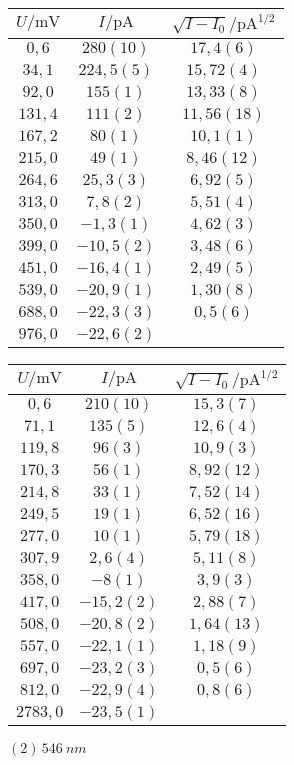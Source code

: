 \begin{figure}[htbp]
   \centering
\parbox{0.475\linewidth}{\centering
\begin{tabular}{c c c}
\hline$U / \unit{\milli\volt}$ & $I / \unit{\pico\ampere}$ & $\sqrt{I-I_0} / \unit{\pico\ampere\tothe{1/2}}$ \\ 
\hline
$0,6$ & $280(10)$ & $17,4(6)$ \\
$34,1$ & $224,5(5)$ & $15,72(4)$ \\
$92,0$ & $155(1)$ & $13,33(8)$ \\
$131,4$ & $111(2)$ & $11,56(18)$ \\
$167,2$ & $80(1)$ & $10,1(1)$ \\
$215,0$ & $49(1)$ & $8,46(12)$ \\
$264,6$ & $25,3(3)$ & $6,92(5)$ \\
$313,0$ & $7,8(2)$ & $5,51(4)$ \\
$350,0$ & $-1,3(1)$ & $4,62(3)$ \\
$399,0$ & $-10,5(2)$ & $3,48(6)$ \\
$451,0$ & $-16,4(1)$ & $2,49(5)$ \\
$539,0$ & $-20,9(1)$ & $1,30(8)$ \\
$688,0$ & $-22,3(3)$ & $0,5(6)$ \\
$976,0$ & $-22,6(2)$ &    \\
\hline\end{tabular}
\caption{$(1)\,\SI{546}{nm}$}
}\quad\parbox{0.475\linewidth}{\centering
\begin{tabular}{c c c}
\hline$U / \unit{\milli\volt}$ & $I / \unit{\pico\ampere}$ & $\sqrt{I-I_0} / \unit{\pico\ampere\tothe{1/2}}$ \\ 
\hline
$0,6$ & $210(10)$ & $15,3(7)$ \\
$71,1$ & $135(5)$ & $12,6(4)$ \\
$119,8$ & $96(3)$ & $10,9(3)$ \\
$170,3$ & $56(1)$ & $8,92(12)$ \\
$214,8$ & $33(1)$ & $7,52(14)$ \\
$249,5$ & $19(1)$ & $6,52(16)$ \\
$277,0$ & $10(1)$ & $5,79(18)$ \\
$307,9$ & $2,6(4)$ & $5,11(8)$ \\
$358,0$ & $-8(1)$ & $3,9(3)$ \\
$417,0$ & $-15,2(2)$ & $2,88(7)$ \\
$508,0$ & $-20,8(2)$ & $1,64(13)$ \\
$557,0$ & $-22,1(1)$ & $1,18(9)$ \\
$697,0$ & $-23,2(3)$ & $0,5(6)$ \\
$812,0$ & $-22,9(4)$ & $0,8(6)$ \\
$2783,0$ & $-23,5(1)$ &    \\
\hline\end{tabular}
\caption{$(2)\,\SI{546}{nm}$}
}\end{figure}